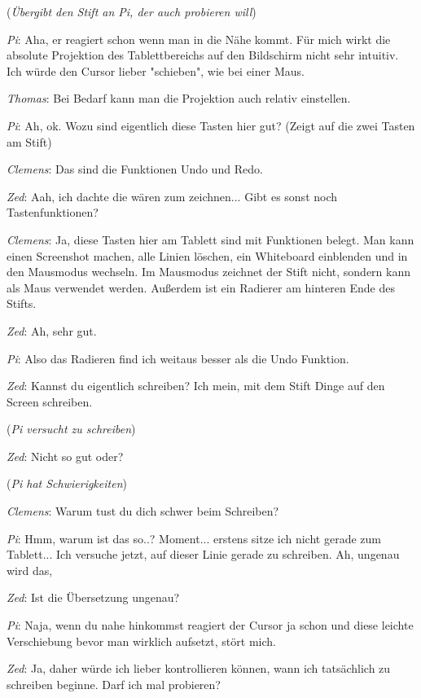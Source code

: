 \medskip (\emph{Übergibt den Stift an Pi, der auch probieren will})

\medskip \emph{Pi}: Aha, er reagiert schon wenn man in die Nähe kommt. Für mich wirkt die absolute Projektion des Tablettbereichs auf den Bildschirm nicht sehr intuitiv. Ich würde den Cursor lieber "schieben", wie bei einer Maus.

\medskip \emph{Thomas}: Bei Bedarf kann man die Projektion auch relativ einstellen.

\medskip \emph{Pi}: Ah, ok. Wozu sind eigentlich diese Tasten hier gut? (Zeigt auf die zwei Tasten am Stift) 

\medskip \emph{Clemens}: Das sind die Funktionen Undo und Redo.

\medskip \emph{Zed}: Aah, ich dachte die wären zum zeichnen... Gibt es sonst noch Tastenfunktionen?

\medskip \emph{Clemens}: Ja, diese Tasten hier am Tablett sind mit Funktionen belegt. Man kann einen Screenshot machen, alle Linien löschen, ein Whiteboard einblenden und in den Mausmodus wechseln. Im Mausmodus zeichnet der Stift nicht, sondern kann als Maus verwendet werden. Außerdem ist ein Radierer am hinteren Ende des Stifts.

\medskip \emph{Zed}: Ah, sehr gut.

\medskip \emph{Pi}: Also das Radieren find ich weitaus besser als die Undo Funktion.

\medskip \emph{Zed}: Kannst du eigentlich schreiben? Ich mein, mit dem Stift Dinge auf den Screen schreiben. 

\medskip (\emph{Pi versucht zu schreiben})

\medskip \emph{Zed}: Nicht so gut oder?

\medskip (\emph{Pi hat Schwierigkeiten})

\medskip \emph{Clemens}: Warum tust du dich schwer beim Schreiben?

\medskip \emph{Pi}: Hmm, warum ist das so..? Moment... erstens sitze ich nicht gerade zum Tablett... Ich versuche jetzt, auf dieser Linie gerade zu schreiben. Ah, ungenau wird das,

\medskip \emph{Zed}: Ist die Übersetzung ungenau?

\medskip \emph{Pi}: Naja, wenn du nahe hinkommst reagiert der Cursor ja schon und diese leichte Verschiebung bevor man wirklich aufsetzt, stört mich. 

\medskip \emph{Zed}: Ja, daher würde ich lieber kontrollieren können, wann ich tatsächlich zu schreiben beginne. Darf ich mal probieren?

